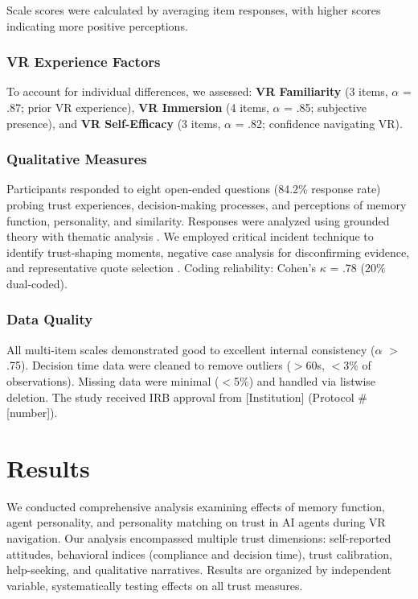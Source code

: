 \documentclass[12pt]{article}
\begin{document}
Scale scores were calculated by averaging item responses, with higher scores indicating more positive perceptions.

\subsubsection{VR Experience Factors}

To account for individual differences, we assessed: \textbf{VR Familiarity} (3 items, $\alpha$ = .87; prior VR experience), \textbf{VR Immersion} (4 items, $\alpha$ = .85; subjective presence), and \textbf{VR Self-Efficacy} (3 items, $\alpha$ = .82; confidence navigating VR).

\subsubsection{Qualitative Measures}

Participants responded to eight open-ended questions (84.2\% response rate) probing trust experiences, decision-making processes, and perceptions of memory function, personality, and similarity. Responses were analyzed using grounded theory with thematic analysis \citep{glaser1967discovery}. We employed critical incident technique \citep{flanagan1954critical} to identify trust-shaping moments, negative case analysis \citep{lincoln1985naturalistic} for disconfirming evidence, and representative quote selection \citep{pratt2009editors}. Coding reliability: Cohen's $\kappa$ = .78 (20\% dual-coded).

\subsubsection{Data Quality}

All multi-item scales demonstrated good to excellent internal consistency ($\alpha$ $>$ .75). Decision time data were cleaned to remove outliers ($>$60s, $<$3\% of observations). Missing data were minimal ($<$5\%) and handled via listwise deletion. The study received IRB approval from [Institution] (Protocol \#[number]).

\section{Results}

We conducted comprehensive analysis examining effects of memory function, agent personality, and personality matching on trust in AI agents during VR navigation. Our analysis encompassed multiple trust dimensions: self-reported attitudes, behavioral indices (compliance and decision time), trust calibration, help-seeking, and qualitative narratives. Results are organized by independent variable, systematically testing effects on all trust measures.
\end{document}
